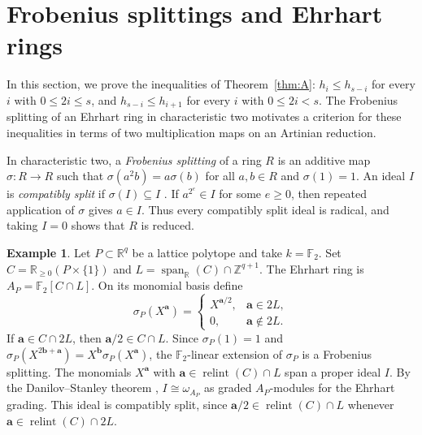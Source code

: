 \documentclass[a4paper,11pt]{amsart}
\DeclareMathOperator{\relint}{relint}
\newcommand{\kk}{k}
\newcommand{\ZZ}{\mathbb{Z}}
\newcommand{\RR}{\mathbb{R}}
\theoremstyle{definition}
\newtheorem{example}[theorem]{Example}
\begin{document}
\section{Frobenius splittings and Ehrhart rings}\label{sec:frobenius}

In this section, we prove the inequalities of Theorem~\ref{thm:A}: $h_i\leq h_{s-i}$ for every $i$ with $0\leq 2i\leq s$, and $h_{s-i}\leq h_{i+1}$ for every $i$ with $0\leq 2i<s$. The Frobenius splitting of an Ehrhart ring in characteristic two motivates a criterion for these inequalities in terms of two multiplication maps on an Artinian reduction.

In characteristic two, a \emph{Frobenius splitting} of a ring $R$ is an additive map $\sigma:R\to R$ such that $\sigma(a^2b)=a\sigma(b)$ for all $a,b\in R$ and $\sigma(1)=1$. An ideal $I$ is \emph{compatibly split} if $\sigma(I)\subseteq I$ \cite[Definition~1.1.3]{BK05}. If $a^{2^e}\in I$ for some $e\geq0$, then repeated application of $\sigma$ gives $a\in I$. Thus every compatibly split ideal is radical, and taking $I=0$ shows that $R$ is reduced.

\begin{example}\label{ex:ehrhart-splitting}
Let $P\subset\RR^q$ be a lattice polytope and take $\kk=\mathbb F_2$. Set $C=\RR_{\geq0}(P\times\{1\})$ and $L=\operatorname{span}_{\RR}(C)\cap\ZZ^{q+1}$. The Ehrhart ring is $A_P=\mathbb F_2[C\cap L]$. On its monomial basis define
\[
 \sigma_P(X^{\boldsymbol a})=
 \begin{cases}X^{\boldsymbol a/2},&\boldsymbol a\in2L,\\0,&\boldsymbol a\notin2L.\end{cases}
\]
If $\boldsymbol a\in C\cap2L$, then $\boldsymbol a/2\in C\cap L$. Since $\sigma_P(1)=1$ and $\sigma_P(X^{2\boldsymbol b+\boldsymbol a})=X^{\boldsymbol b}\sigma_P(X^{\boldsymbol a})$, the $\mathbb F_2$-linear extension of $\sigma_P$ is a Frobenius splitting. The monomials $X^{\boldsymbol a}$ with $\boldsymbol a\in\relint(C)\cap L$ span a proper ideal $I$. By the Danilov--Stanley theorem \cite[Theorem~6.3.5]{BH98}, $I\cong\omega_{A_P}$ as graded $A_P$-modules for the Ehrhart grading. This ideal is compatibly split, since $\boldsymbol a/2\in\relint(C)\cap L$ whenever $\boldsymbol a\in\relint(C)\cap2L$.
\end{example}
\end{document}
